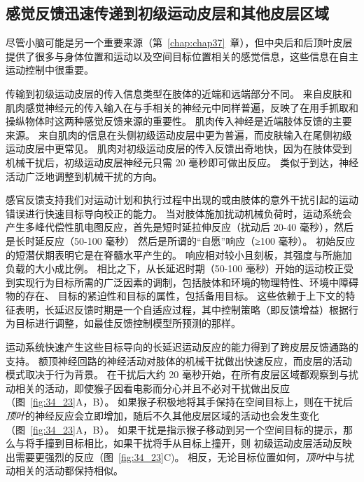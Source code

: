 \subsection{感觉反馈迅速传递到初级运动皮层和其他皮层区域}

尽管小脑可能是另一个重要来源（第~\ref{chap:chap37}~章），但中央后和后顶叶皮层提供了很多与身体位置和运动以及空间目标位置相关的感觉信息，这些信息在自主运动控制中很重要。


传输到初级运动皮层的传入信息类型在肢体的近端和远端部分不同。
来自皮肤和肌肉感觉神经元的传入输入在与手相关的神经元中同样普遍，反映了在用手抓取和操纵物体时这两种感觉反馈来源的重要性。
肌肉传入神经是近端肢体反馈的主要来源。
来自肌肉的信息在头侧初级运动皮层中更为普遍，而皮肤输入在尾侧初级运动皮层中更常见。
肌肉对初级运动皮层的传入反馈出奇地快，因为在肢体受到机械干扰后，初级运动皮层神经元只需 20 毫秒即可做出反应。
类似于到达，神经活动广泛地调整到机械干扰的方向。


感官反馈支持我们对运动计划和执行过程中出现的或由肢体的意外干扰引起的运动错误进行快速目标导向校正的能力。
当对肢体施加扰动机械负荷时，运动系统会产生多峰代偿性肌电图反应，首先是短时延拉伸反应（扰动后 20-40 毫秒），然后是长时延反应（50-100 毫秒） 然后是所谓的“自愿”响应（≥100 毫秒）。
初始反应的短潜伏期表明它是在脊髓水平产生的。
响应相对较小且刻板，其强度与所施加负载的大小成比例。
相比之下，从长延迟时期（50-100 毫秒）开始的运动校正受到实现行为目标所需的广泛因素的调制，包括肢体和环境的物理特性、环境中障碍物的存在、 目标的紧迫性和目标的属性，包括备用目标。
这些依赖于上下文的特征表明，长延迟反馈时期是一个自适应过程，其中控制策略（即反馈增益）根据行为目标进行调整，如最佳反馈控制模型所预测的那样。


运动系统快速产生这些目标导向的长延迟运动反应的能力得到了跨皮层反馈通路的支持。
额顶神经回路的神经活动对肢体的机械干扰做出快速反应，而皮层的活动模式取决于行为背景。
在干扰后大约 20 毫秒开始，在所有皮层区域都观察到与扰动相关的活动，即使猴子因看电影而分心并且不必对干扰做出反应（图~\ref{fig:34_23}A，B）。
如果猴子积极地将其手保持在空间目标上，则在干扰后\textit{顶叶}的神经反应会立即增加，随后不久其他皮层区域的活动也会发生变化（图~\ref{fig:34_23}A，B）。
如果干扰是指示猴子移动到另一个空间目标的提示，那么与将手撞到目标相比，如果干扰将手从目标上撞开，则 初级运动皮层活动反映出需要更强烈的反应（图~\ref{fig:34_23}C)。
相反，无论目标位置如何，\textit{顶叶}中与扰动相关的活动都保持相似。


